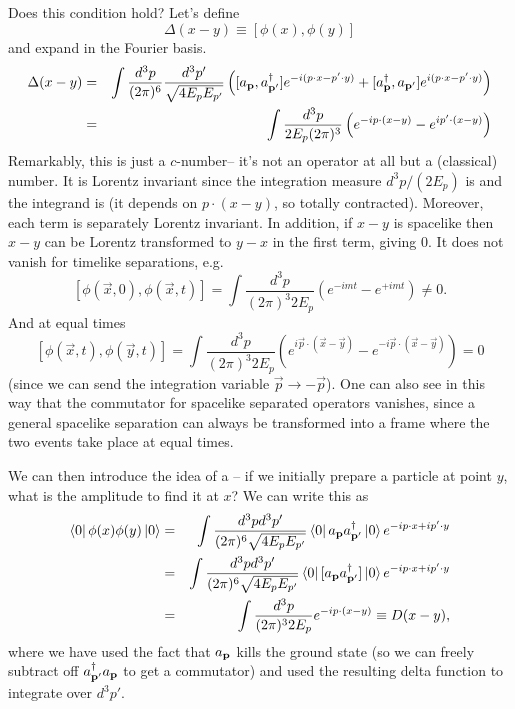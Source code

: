 Does this condition hold? Let's define
$$\Delta(x-y)\equiv [\phi(x),\phi(y)]$$
and expand in the Fourier basis.
\begin{eqnarray*}
\Delta(x-y) &=& \int \frac{d^3p}{(2\pi)^6} \frac{d^3p'}{\sqrt{4E_p E_{p'}}} \left([a_{\boldsymbol{\mathbf{p}}},a_{\boldsymbol{\mathbf{p}}'}^\dagger] e^{-i(p\cdot x - p' \cdot y)}+[a_{\boldsymbol{\mathbf{p}}}^\dagger, a_{\boldsymbol{\mathbf{p}}'}] e^{i(p\cdot x-p' \cdot y)}\right)\\
&=& \int \frac{d^3p}{2E_p(2\pi)^3}\left(e^{-ip\cdot (x-y)}-e^{i p' \cdot (x-y)}\right)
\end{eqnarray*}
Remarkably, this is just a $c$-number-- it's not an operator at all but a (classical) number. It is Lorentz invariant since the integration measure $d^3p/(2E_p)$ is and the integrand is (it depends on $p\cdot (x-y)$, so totally contracted). Moreover, each term is separately Lorentz invariant. In addition, if $x-y$ is spacelike then $x-y$ can be Lorentz transformed to $y-x$ in the first term, giving $0$. It does not vanish for timelike separations, e.g.
$$[\phi (\vec x,0), \phi(\vec x,t)] = \int \frac{d^3p}{(2\pi)^3 2 E_p}(e^{-imt}-e^{+imt})\neq 0.$$
And at equal times 
$$[\phi(\vec x,t),\phi(\vec y, t)]=\int \frac{d^3p}{(2\pi)^3 2E_p}(e^{i\vec p \cdot (\vec x - \vec y)}- e^{-i \vec p \cdot (\vec x- \vec y)})=0$$
(since we can send the integration variable $\vec p\to -\vec p$). One can also see in this way that the commutator for spacelike separated operators vanishes, since a general spacelike separation can always be transformed into a frame where the two events take place at equal times.

\begin{defn}
We can then introduce the idea of a -- if we initially prepare a particle at point $y$, what is the amplitude to find it at $x$? We can write this as
\begin{eqnarray*}
\left< 0 \right|\phi(x) \phi(y)\left| 0 \right>&=&\int \frac{d^3p d^3 p'}{(2\pi)^6\sqrt{4 E_p E_{p'}}} \left< 0 \right| a_{\boldsymbol{\mathbf{p}}} a_{\boldsymbol{\mathbf{p}}'}^\dagger \left| 0 \right>e^{-ip \cdot x +i p'\cdot y}\\
&=&\int \frac{d^3p d^3 p'}{(2\pi)^6\sqrt{4 E_p E_{p'}}} \left< 0 \right| [a_{\boldsymbol{\mathbf{p}}} a_{\boldsymbol{\mathbf{p}}'}^\dagger] \left| 0 \right>e^{-ip \cdot x +i p'\cdot y}\\
&=&\int \frac{d^3p}{(2\pi)^3 2 E_p}e^{-ip\cdot (x-y)} \equiv D(x-y),
\end{eqnarray*}
where we have used the fact that $a_{\boldsymbol{\mathbf{p}}}$ kills the ground state (so we can freely subtract off $a_{\boldsymbol{\mathbf{p}}'}^\dagger a_{\boldsymbol{\mathbf{p}}}$ to get a commutator) and used the resulting delta function to integrate over $d^3p'$.
\end{defn}

